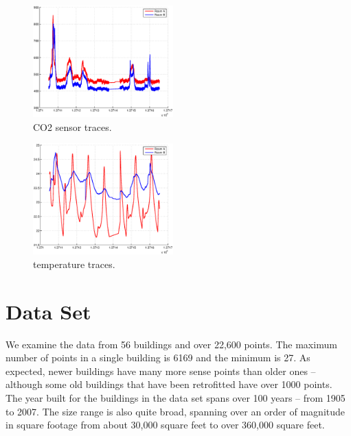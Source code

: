 
\begin{figure}[h!]
\centering
    \includegraphics[width=0.48\textwidth]{figs/co2_pair.eps}
    \caption{CO2 sensor traces.}
\label{fig:co2traces}
\end{figure}

\begin{figure}[h!]
\centering
    \includegraphics[width=0.48\textwidth]{figs/temp_pair.eps}
    \caption{temperature traces.}
\label{fig:temptraces}
\end{figure}

% 


\section{Data Set}
We examine the data from 56 buildings and over 22,600 points.  The maximum number of points in a 
single building is 6169 and the minimum is 27.  As expected, newer buildings have many more sense 
points than older ones -- although some old buildings that have been retrofitted have over 1000  
points. The year built for the buildings in the data set spans over 100 years -- from 1905 to 2007.
The size range is also quite broad, spanning over an order of magnitude in square footage from
about 30,000 square feet to over 360,000 square feet.


